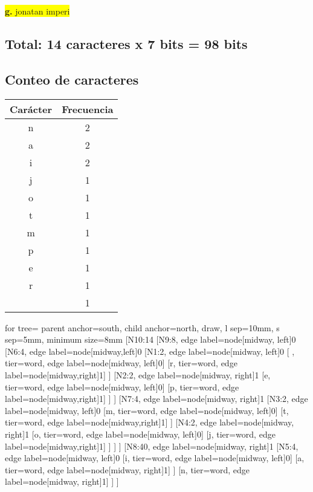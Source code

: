\documentclass{article}
\begin{document}
	\vspace{0.5cm}
	\begin{center}
		\hspace{3cm}\colorbox{yellow}{{\textbf{g.} jonatan imperi}}\newline
		\subsection*{Total: 14 caracteres x 7 bits = 98 bits}
		\vspace{0.5cm}
		\subsection*{Conteo de caracteres}
		\begin{tabular}{c|c}
			\textbf{Carácter} & \textbf{Frecuencia} \\
			\hline
			n & 2 \\
			a & 2 \\
			i & 2 \\
			j & 1 \\
			o & 1 \\
			t & 1 \\
			m & 1 \\  
			p & 1 \\
			e & 1 \\
			r & 1 \\
			  & 1 \\        
		\end{tabular}
		
		\vspace{1cm}
		
		\begin{forest}
			for tree={
				parent anchor=south,
				child anchor=north,
				draw,
				l sep=10mm,
				s sep=5mm,
				minimum size=8mm
			}
			[N10:14
				[N9:8, edge label={node[midway, left]{0}}
					[N6:4, edge label={node[midway,left]{0}}
						[N1:2, edge label={node[midway, left]{0}}
							[ , tier=word, edge label={node[midway, left]{0}}]
							[r, tier=word, edge label={node[midway,right]{1}}]
						]
						[N2:2, edge label={node[midway, right]{1}}
							[e, tier=word, edge label={node[midway, left]{0}}]
							[p, tier=word, edge label={node[midway,right]{1}}]
						]
					]
					[N7:4, edge label={node[midway, right]{1}}
						[N3:2, edge label={node[midway, left]{0}}
							[m, tier=word, edge label={node[midway, left]{0}}]
							[t, tier=word, edge label={node[midway,right]{1}}]
						]
						[N4:2, edge label={node[midway, right]{1}}
							[o, tier=word, edge label={node[midway, left]{0}}]
							[j, tier=word, edge label={node[midway,right]{1}}]
						]
					]	
				]
				[N8:40, edge label={node[midway, right]{1}}
					[N5:4, edge label={node[midway, left]{0}}
						[i, tier=word, edge label={node[midway, left]{0}}]
						[a, tier=word, edge label={node[midway, right]{1}}]
					]
					[n, tier=word, edge label={node[midway, right]{1}}]
				]
			]
		\end{forest}
		

\end{center}
\end{document}
